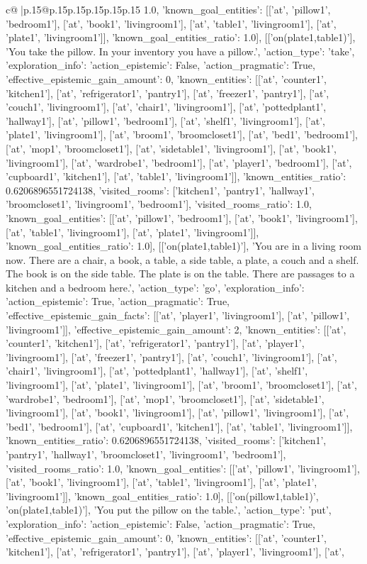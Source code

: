 \documentclass{article}
\begin{document}
{\begin{supertabular}{c@{$\;$}|p{.15\linewidth}@{}p{.15\linewidth}p{.15\linewidth}p{.15\linewidth}p{.15\linewidth}p{.15\linewidth}}
{{{1.0, 'known_goal_entities': [['at', 'pillow1', 'bedroom1'], ['at', 'book1', 'livingroom1'], ['at', 'table1', 'livingroom1'], ['at', 'plate1', 'livingroom1']], 'known_goal_entities_ratio': 1.0}}], [['on(plate1,table1)'], 'You take the pillow. In your inventory you have a pillow.', {'action_type': 'take', 'exploration_info': {'action_epistemic': False, 'action_pragmatic': True, 'effective_epistemic_gain_amount': 0, 'known_entities': [['at', 'counter1', 'kitchen1'], ['at', 'refrigerator1', 'pantry1'], ['at', 'freezer1', 'pantry1'], ['at', 'couch1', 'livingroom1'], ['at', 'chair1', 'livingroom1'], ['at', 'pottedplant1', 'hallway1'], ['at', 'pillow1', 'bedroom1'], ['at', 'shelf1', 'livingroom1'], ['at', 'plate1', 'livingroom1'], ['at', 'broom1', 'broomcloset1'], ['at', 'bed1', 'bedroom1'], ['at', 'mop1', 'broomcloset1'], ['at', 'sidetable1', 'livingroom1'], ['at', 'book1', 'livingroom1'], ['at', 'wardrobe1', 'bedroom1'], ['at', 'player1', 'bedroom1'], ['at', 'cupboard1', 'kitchen1'], ['at', 'table1', 'livingroom1']], 'known_entities_ratio': 0.6206896551724138, 'visited_rooms': ['kitchen1', 'pantry1', 'hallway1', 'broomcloset1', 'livingroom1', 'bedroom1'], 'visited_rooms_ratio': 1.0, 'known_goal_entities': [['at', 'pillow1', 'bedroom1'], ['at', 'book1', 'livingroom1'], ['at', 'table1', 'livingroom1'], ['at', 'plate1', 'livingroom1']], 'known_goal_entities_ratio': 1.0}}], [['on(plate1,table1)'], 'You are in a living room now. There are a chair, a book, a table, a side table, a plate, a couch and a shelf. The book is on the side table. The plate is on the table. There are passages to a kitchen and a bedroom here.', {'action_type': 'go', 'exploration_info': {'action_epistemic': True, 'action_pragmatic': True, 'effective_epistemic_gain_facts': [['at', 'player1', 'livingroom1'], ['at', 'pillow1', 'livingroom1']], 'effective_epistemic_gain_amount': 2, 'known_entities': [['at', 'counter1', 'kitchen1'], ['at', 'refrigerator1', 'pantry1'], ['at', 'player1', 'livingroom1'], ['at', 'freezer1', 'pantry1'], ['at', 'couch1', 'livingroom1'], ['at', 'chair1', 'livingroom1'], ['at', 'pottedplant1', 'hallway1'], ['at', 'shelf1', 'livingroom1'], ['at', 'plate1', 'livingroom1'], ['at', 'broom1', 'broomcloset1'], ['at', 'wardrobe1', 'bedroom1'], ['at', 'mop1', 'broomcloset1'], ['at', 'sidetable1', 'livingroom1'], ['at', 'book1', 'livingroom1'], ['at', 'pillow1', 'livingroom1'], ['at', 'bed1', 'bedroom1'], ['at', 'cupboard1', 'kitchen1'], ['at', 'table1', 'livingroom1']], 'known_entities_ratio': 0.6206896551724138, 'visited_rooms': ['kitchen1', 'pantry1', 'hallway1', 'broomcloset1', 'livingroom1', 'bedroom1'], 'visited_rooms_ratio': 1.0, 'known_goal_entities': [['at', 'pillow1', 'livingroom1'], ['at', 'book1', 'livingroom1'], ['at', 'table1', 'livingroom1'], ['at', 'plate1', 'livingroom1']], 'known_goal_entities_ratio': 1.0}}], [['on(pillow1,table1)', 'on(plate1,table1)'], 'You put the pillow on the table.', {'action_type': 'put', 'exploration_info': {'action_epistemic': False, 'action_pragmatic': True, 'effective_epistemic_gain_amount': 0, 'known_entities': [['at', 'counter1', 'kitchen1'], ['at', 'refrigerator1', 'pantry1'], ['at', 'player1', 'livingroom1'], ['at', }}}
\end{supertabular}}
\end{document}
